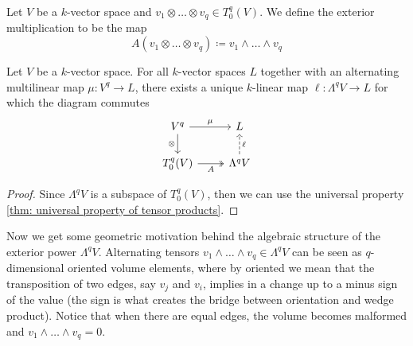 \begin{definition}
  \label{def: exterior multiplication}
  Let \(V\) be a \(k\)-vector space and \(v_1 \otimes \dots \otimes v_q \in
  T_0^q(V)\). We define the exterior multiplication to be the map
  \[
    A(v_1 \otimes \dots \otimes v_q) \coloneqq v_1 \wedge \dots \wedge v_q
  \]
\end{definition}

\begin{proposition}
  \label{prop: exterior power universal property}
  Let \(V\) be a \(k\)-vector space. For all \(k\)-vector spaces \(L\) together
  with an alternating multilinear map \(\mu: V^q \to L\), there exists a unique
  \(k\)-linear map \(\ell: \Lambda^q V \to L\) for which the diagram commutes
  \[
    \begin{tikzcd}
      V^q \ar[d, swap, "\otimes"] \ar[r, "\mu"]  &L \\
      T_0^q(V) \ar[r, swap, two heads, "A"]
      &\Lambda^q V \ar[u, dashed, swap, "\ell"]
    \end{tikzcd}
  \]
\end{proposition}

\begin{proof}
  Since \(\Lambda^q V\) is a subspace of \(T_0^q(V)\), then we can use the
  universal property \cref{thm: universal property of tensor products}.
\end{proof}

Now we get some geometric motivation behind the algebraic structure of the
exterior power \(\Lambda^q V\). Alternating tensors \(v_1 \wedge \dots \wedge
v_q \in \Lambda^q V\) can be seen as \(q\)-dimensional oriented volume elements,
where by oriented we mean that the transposition of two edges, say \(v_j\) and
\(v_i\), implies in a change up to a minus sign of the value (the sign is what
creates the bridge between orientation and wedge product). Notice that when
there are equal edges, the volume becomes malformed and \(v_1 \wedge \dots
\wedge v_q = 0\).

